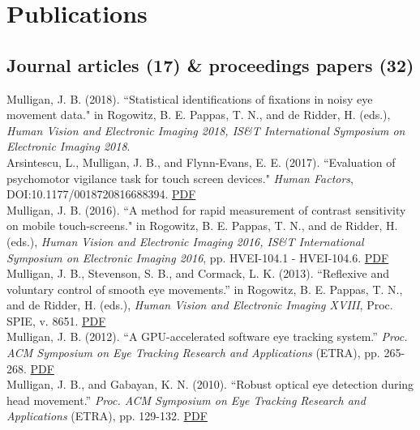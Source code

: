 \documentclass[12pt]{article}
\newcommand{\years}[1]{\marginnote{\scriptsize #1}}
\begin{document}
\section*{Publications}


\subsection*{Journal articles (17) \& proceedings papers (32)}
\noindent

\years{2018}
Mulligan, J. B. (2018).  ``Statistical identifications of fixations in noisy eye movement data." in Rogowitz, B. E. Pappas, T. N., and de Ridder, H. (eds.), \emph{Human Vision and Electronic Imaging 2018, IS\&T International Symposium on Electronic Imaging 2018}.\\

\years{2017}
Arsintescu, L., Mulligan, J. B., and Flynn-Evans, E. E. (2017).
``Evaluation of psychomotor vigilance task for touch screen devices."
\emph{Human Factors},
\newline
DOI:10.1177/0018720816688394.
\href{https://hsi.arc.nasa.gov/publications/Arsintescu_Mulligan_Flynn-Evans_pvt.pdf}{PDF}
\\

\years{2016}
Mulligan, J. B. (2016).  ``A method for rapid measurement of contrast sensitivity on mobile touch-screens." in Rogowitz, B. E. Pappas, T. N., and de Ridder, H. (eds.), \emph{Human Vision and Electronic Imaging 2016, IS\&T International Symposium on Electronic Imaging 2016},  pp. HVEI-104.1 - HVEI-104.6.  \href{http://www.ingentaconnect.com/contentone/ist/ei/2016/00002016/00000016/art00009}{PDF}\\

\years{2013}
Mulligan, J. B., Stevenson, S. B., and Cormack, L. K. (2013).
``Reflexive and voluntary control of smooth eye movements.”
in Rogowitz, B. E. Pappas, T. N., and de Ridder, H. (eds.),
\emph{Human Vision and Electronic Imaging XVIII},
Proc. SPIE, v. 8651.  \href{http://scanpath.arc.nasa.gov/pub_files/spie13.pdf}{PDF}\\

\years{2012}
Mulligan, J. B. (2012).
``A GPU-accelerated software eye tracking system.”
\emph{Proc. ACM Symposium on Eye Tracking Research and Applications} (ETRA),
pp. 265-268.  \href{http://scanpath.arc.nasa.gov/pub_files/etra12.pdf}{PDF}\\

\years{2010}
Mulligan, J. B., and Gabayan, K. N. (2010).
``Robust optical eye detection during head movement.”
\emph{Proc. ACM Symposium on Eye Tracking Research and Applications} (ETRA),
pp. 129-132.  \href{http://scanpath.arc.nasa.gov/pub_files/etra10.pdf}{PDF}\\
\end{document}
